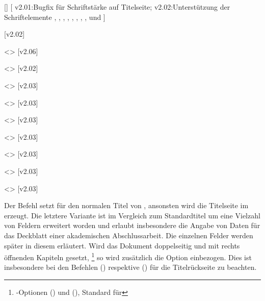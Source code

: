 \begin{DeclareEntity*}{}
\begin{DeclareEntity*}{}
\begin{DeclareEntity*}{}
\begin{Declaration}
  {[]}
[%
  v2.01:Bugfix für Schriftstärke auf Titelseite;%
  v2.02:Unterstützung der Schriftelemente , 
    , , , , 
    , , , 
     und %
]
\begin{Declaration}
  {}
  [v2.02]
\begin{Declaration}
  {}
  <>
  [v2.06]
\begin{Declaration}
  {}
  <>
  [v2.02]
\begin{Declaration}
  {}
  <>
  [v2.03]
\begin{Declaration}
  {}
  <>
  [v2.03]
\begin{Declaration}
  {}
  <>
  [v2.03]
\begin{Declaration}
  {}
  <>
  [v2.03]
\begin{Declaration}
  {}
  <>
  [v2.03]
\begin{Declaration}
  {}
  <>
  [v2.03]
\begin{Declaration}
  {}
  <>
  [v2.03]

Der Befehl  setzt für  den normalen 
Titel von \KOMAScript, ansonsten wird die Titelseite im \TUDCD erzeugt. Die 
letztere Variante ist im Vergleich zum Standardtitel um eine Vielzahl von 
Feldern erweitert worden und erlaubt insbesondere die Angabe von Daten für das 
Deckblatt einer akademischen Abschlussarbeit. Die einzelnen Felder werden 
später in diesem \autorefname erläutert. Wird das Dokument doppelseitig und mit 
rechts öffnenden Kapiteln gesetzt,%
\footnote{%
  \KOMAScript-Optionen () und 
  (), Standard für %
}
so wird zusätzlich die Option  einbezogen. Dies 
ist insbesondere bei den Befehlen () 
respektive () für die Titelrückseite 
zu beachten.


\end{Declaration}
\end{Declaration}
\end{Declaration}
\end{Declaration}
\end{Declaration}
\end{Declaration}
\end{Declaration}
\end{Declaration}
\end{Declaration}
\end{Declaration}
\end{Declaration}
\end{DeclareEntity*}
\end{DeclareEntity*}
\end{DeclareEntity*}
